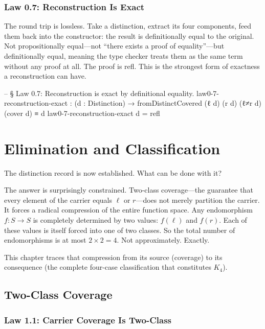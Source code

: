 \documentclass[11pt,a4paper]{book}
\def\texttt#1{#1}%
\begin{document}
\subsection{Law 0.7: Reconstruction Is Exact}

The round trip is lossless. Take a distinction, extract its four components, feed them back into the constructor: the result is definitionally equal to the original. Not propositionally equal—not ``there exists a proof of equality''—but definitionally equal, meaning the type checker treats them as the same term without any proof at all. The proof is \texttt{refl}. This is the strongest form of exactness a reconstruction can have.

\begin{code}
-- § Law 0.7: Reconstruction is exact by definitional equality.
law0-7-reconstruction-exact :
  (d : Distinction) →
  fromDistinctCovered (ℓ d) (r d) (ℓ≠r d) (cover d) ≡ d
law0-7-reconstruction-exact d = refl
\end{code}

\chapter{Elimination and Classification}

The distinction record is now established. What can be done with it?

The answer is surprisingly constrained. Two-class coverage—the guarantee that every element of the carrier equals $\ell$ or $r$—does not merely partition the carrier. It forces a radical compression of the entire function space. Any endomorphism $f : S \to S$ is completely determined by two values: $f(\ell)$ and $f(r)$. Each of these values is itself forced into one of two classes. So the total number of endomorphisms is at most $2 \times 2 = 4$. Not approximately. Exactly.

This chapter traces that compression from its source (coverage) to its consequence (the complete four-case classification that constitutes $K_4$).

\section{Two-Class Coverage}

\subsection{Law 1.1: Carrier Coverage Is Two-Class}
\end{document}
